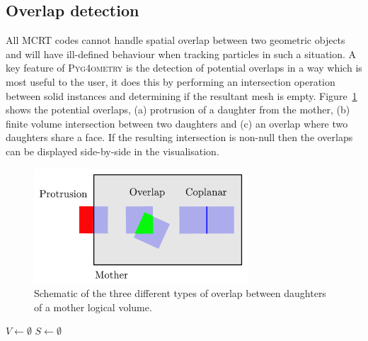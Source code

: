 \documentclass[final,5p,times,twocolumn]{elsarticle}
\newcommand{\PYGEOMETRY}{\textsc{Pyg4ometry}}
\begin{document}
\subsection{Overlap detection}
All MCRT codes cannot handle spatial overlap between two geometric objects and will have ill-defined behaviour when tracking particles  
in such a situation.  A key feature of \PYGEOMETRY{} is the detection of potential overlaps in a way which is most useful to the user, it does this by 
performing an intersection operation between solid instances and determining if the resultant mesh is empty. Figure~\ref{fig:overlap} shows the potential 
overlaps, (a) protrusion of a daughter from the mother, (b)  finite volume intersection between two daughters  and (c) an overlap where two daughters 
share a face. If the resulting intersection is non-null then the overlaps can be displayed side-by-side in the visualisation. 
\begin{figure}[htbp]
\begin{center}
\includegraphics[width=8cm]{./diagrams/overlap.pdf}
\caption{Schematic of the three different types of overlap between daughters of a mother logical volume.}
\label{fig:overlap}
\end{center}
\end{figure} 


\begin{algorithm}[h]
  
  $V \longleftarrow \emptyset$
  $S \longleftarrow \emptyset$\;
  
  \label{algo:overlap}
  \caption{The overlap checking algorithm employed in \PYGEOMETRY{}.}
\end{algorithm}
\end{document}
